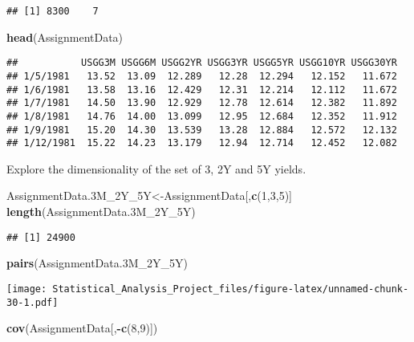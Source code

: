 \documentclass[]{article}
\newenvironment{Shaded}{\begin{snugshade}}{\end{snugshade}}
\newcommand{\KeywordTok}[1]{\textcolor[rgb]{0.13,0.29,0.53}{\textbf{#1}}}
\newcommand{\DecValTok}[1]{\textcolor[rgb]{0.00,0.00,0.81}{#1}}
\newcommand{\OperatorTok}[1]{\textcolor[rgb]{0.81,0.36,0.00}{\textbf{#1}}}
\newcommand{\NormalTok}[1]{#1}
\begin{document}
\begin{verbatim}
## [1] 8300    7
\end{verbatim}

\begin{Shaded}
\begin{Highlighting}[]
\KeywordTok{head}\NormalTok{(AssignmentData)}
\end{Highlighting}
\end{Shaded}

\begin{verbatim}
##           USGG3M USGG6M USGG2YR USGG3YR USGG5YR USGG10YR USGG30YR
## 1/5/1981   13.52  13.09  12.289   12.28  12.294   12.152   11.672
## 1/6/1981   13.58  13.16  12.429   12.31  12.214   12.112   11.672
## 1/7/1981   14.50  13.90  12.929   12.78  12.614   12.382   11.892
## 1/8/1981   14.76  14.00  13.099   12.95  12.684   12.352   11.912
## 1/9/1981   15.20  14.30  13.539   13.28  12.884   12.572   12.132
## 1/12/1981  15.22  14.23  13.179   12.94  12.714   12.452   12.082
\end{verbatim}

Explore the dimensionality of the set of 3, 2Y and 5Y yields.

\begin{Shaded}
\begin{Highlighting}[]
\NormalTok{AssignmentData.3M_2Y_5Y<-AssignmentData[,}\KeywordTok{c}\NormalTok{(}\DecValTok{1}\NormalTok{,}\DecValTok{3}\NormalTok{,}\DecValTok{5}\NormalTok{)]}
\KeywordTok{length}\NormalTok{(AssignmentData.3M_2Y_5Y)}
\end{Highlighting}
\end{Shaded}

\begin{verbatim}
## [1] 24900
\end{verbatim}

\begin{Shaded}
\begin{Highlighting}[]
\KeywordTok{pairs}\NormalTok{(AssignmentData.3M_2Y_5Y)}
\end{Highlighting}
\end{Shaded}

\texttt{[image: Statistical\_Analysis\_Project\_files/figure-latex/unnamed-chunk-30-1.pdf]}

\begin{Shaded}
\begin{Highlighting}[]
\KeywordTok{cov}\NormalTok{(AssignmentData[,}\OperatorTok{-}\KeywordTok{c}\NormalTok{(}\DecValTok{8}\NormalTok{,}\DecValTok{9}\NormalTok{)])}
\end{Highlighting}
\end{Shaded}
\end{document}
